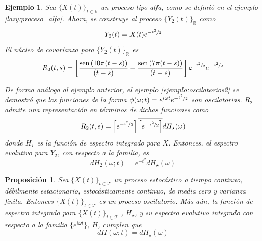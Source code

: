 \documentclass[12pt,letterpaper]{book}
\newtheorem{proposicion}[teorema]{Proposición}
\newtheorem{ejemplo}{Ejemplo}[chapter]
\newcommand{\R}{\mathbb{R}}
\newcommand{\intR}{\int_{-\infty}^{\infty}}
\newcommand{\SEN}[1]{\mathrm{sen}\left( #1 \right)}
\newcommand{\abso}[1]{\left| #1 \right|}
\newcommand{\xt}{$\{X(t)\}_{t\in \mathcal{T}}$ }
\newcommand{\xtin}[1]{$\{X(t)\}_{t\in \mathcal{ #1 }}$ }
\begin{document}
\begin{ejemplo}
Sea \xtin{\R} un proceso tipo alfa, como se definió en el ejemplo \ref{lazy:proceso_alfa}. 
%
Ahora, se construye al proceso $\{Y_2(t)\}_{\R}$ como
\begin{equation}
Y_2(t) = X(t) e^{-\nicefrac{t^2}{2}}
\end{equation}
%
El núcleo de covarianza para $\{Y_2(t)\}_{\R}$ es
\begin{equation}
R_2(t,s) = \left[ \frac{\SEN{10 \pi (t-s)}}{(t-s)} - \frac{\SEN{7 \pi (t-s)}}{(t-s)} \right] e^{-\nicefrac{t^2}{2}} e^{-\nicefrac{s^2}{2}}
\end{equation}

De forma análoga al ejemplo anterior, el ejemplo \ref{ejemplo:oscilatorios2} se demostró que las funciones de la forma $\phi(\omega; t) = e^{i \omega t} e^{-\nicefrac{t^2}{2}}$ son oscilatorias. $R_2$ admite una representación en términos de dichas funciones como
\begin{equation}
R_2(t,s) = \left[e^{-\nicefrac{t^2}{2}} \right] \overline{\left[ e^{-\nicefrac{s^2}{2}} \right]}  dH_\star(\omega)
\end{equation}
donde $H_\star$ es la función de espectro integrado para $X$. Entonces, el espectro evolutivo para $Y_2$, con respecto a la familia, es
\begin{equation}
dH_2(\omega;t) = e^{-{t^2}} dH_\star(\omega)
\end{equation}
\label{ejemplo:lazy2}
\end{ejemplo}

\begin{proposicion}
Sea \xt un proceso estocástico a tiempo continuo, débilmente estacionario, estocásticamente continuo, de media cero y varianza finita.
%
Entonces \xt es un proceso oscilatorio.
%
Más aún, la función de espectro integrado para \xt, $H_\star$, y su espectro evolutivo integrado con respecto a la familia $\{ e^{i \omega t} \}$, $H$, cumplen que
\begin{equation}
dH(\omega; t) = dH_\star(\omega)
\end{equation}
\label{lazy:redux}
\label{lazy11}
\end{proposicion}
\end{document}
